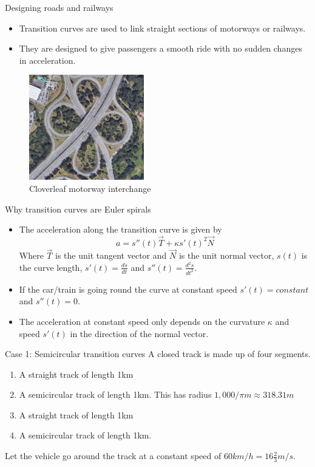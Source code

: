 \documentclass{beamer}
\begin{document}
\begin{frame}{Designing roads and railways}
	\begin{itemize}
		\item Transition curves are used to link straight sections of motorways or railways.
		\item They are designed to give passengers a smooth ride with no sudden changes in acceleration.

	\end{itemize}
		\begin{figure}
		\caption{Cloverleaf motorway interchange}
		\centering
		\includegraphics[width=50mm, scale=0.5]{cloverleaf_motorway.png}
	\end{figure}

\end{frame}

\begin{frame}{Why transition curves are Euler spirals}
	\begin{itemize}
	\item The acceleration along the transition curve is given by
 	 \[
 	 a=s''(t) \vec{T}+\kappa s'(t)^2 \vec{N}
 	 \]
 	 Where $\vec{T}$ is the unit tangent vector and $\vec{N}$ is the unit normal vector, $s(t)$ is the curve length, $s'(t) = \frac{ds}{dt}$ and $s''(t) = \frac{d^2 s}{dt^2}$.
 	 \item If the car/train is going round the curve at constant speed $s'(t)=constant$ and $s''(t)=0$.	
 	 \item The acceleration at constant speed only depends on the curvature $\kappa$ and speed $s'(t)$ in the direction of the normal vector.
	\end{itemize}
\end{frame}

\begin{frame}{Case 1: Semicircular transition curves}
	A closed  track is made up of four segments.
	\begin{enumerate}
		\item A straight track of length 1km
		\item A semicircular track of length 1km. This has radius $1,000 / \pi m \approx 318.31m$
		\item A straight track of length 1km
		\item A semicircular track of length 1km.
	\end{enumerate}
	Let the vehicle go around the track at a constant speed of $60 km/h = 16 \frac{2}{3} m/s$.
\end{frame}
\end{document}

